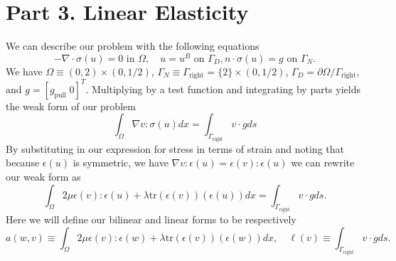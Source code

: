 \documentclass{article}
\begin{document}
\section*{Part 3. Linear Elasticity}
We can describe our problem with the following equations
\begin{equation*}
	-\nabla \cdot \sigma(u) = 0 \text{ in } \Omega, \quad u = u^B \text{ on } \Gamma_D, n\cdot \sigma(u) = g \text{ on } \Gamma_N.
\end{equation*}
We have \(\Omega \equiv (0,2)\times(0,1/2) \), \(\Gamma_N \equiv \Gamma_\text{right} = \{2\}\times(0,1/2) \), \(\Gamma_D = \partial\Omega/\Gamma_\text{right} \), and \(g = \left[g_{\text{pull}}\; 0\right]^T \). Multiplying by a test function and integrating by parts yields the weak form of our problem
\begin{equation*}
	\int_{\Omega} \nabla v : \sigma(u)dx = \int_{\Gamma_\text{right}}v\cdot gds
\end{equation*}
By substituting in our expression for stress in terms of strain and noting that because \(\epsilon(u)\) is symmetric, we have \(\nabla v : \epsilon(u) = \epsilon(v):\epsilon(u) \) we can rewrite our weak form as
\begin{equation*}
	\int_{\Omega} 2 \mu \epsilon(v):\epsilon(u) + \lambda\text{tr}(\epsilon(v))(\epsilon(u))dx = \int_{\Gamma_\text{right}}v\cdot gds.
\end{equation*}
Here we will define our bilinear and linear forms to be respectively
\begin{equation*}
	a(w,v) \equiv\int_{\Omega} 2 \mu \epsilon(v):\epsilon(w) + \lambda\text{tr}(\epsilon(v))(\epsilon(w))dx , \quad \ell(v) \equiv  \int_{\Gamma_\text{right}}v\cdot gds.
\end{equation*}
\end{document}
